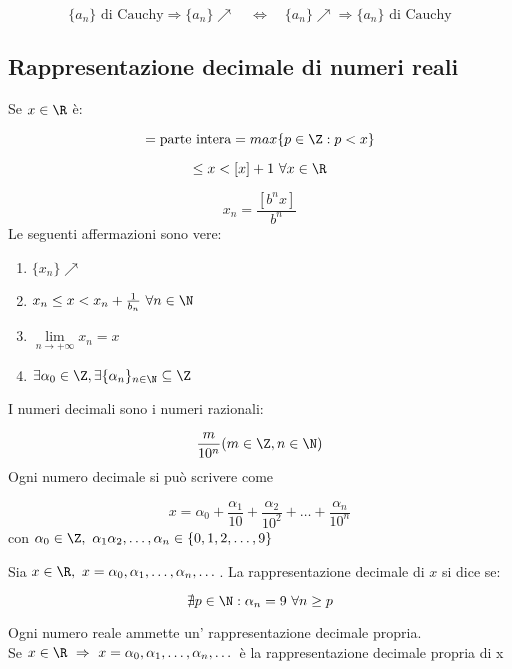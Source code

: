 \documentclass[../appunti.tex]{subfiles}
\begin{document}
\begin{equation}
	\{ a_n \} \mbox{ di Cauchy} \Rightarrow \{ a_n \} \nearrow \quad \iff
 	\quad \{ a_n \}  \nearrow \Rightarrow  \{a_n \}  \mbox{ di Cauchy}
\end{equation}
\subsection{Rappresentazione decimale di numeri reali}
Se $ x \in \R $ è:

\begin{equation}
	[ x ] = \mbox{parte intera} = max\{ p \in \Z: p < x \} 
\end{equation}
\bda

\begin{equation}
	[ x ] \leq x < [ x ] + 1\ \forall x \in \R 
\end{equation}
\bda 

\begin{equation}
	x_n = \frac{[b^nx]}{b^n}
\end{equation}
Le seguenti affermazioni sono vere:

\begin{enumerate}
	\item $\{ x_n \} \nearrow $ 
	\item $x_n \leq x < x_n + \frac{1}{b_n}\ \forall n \in \N $
	\item $\lim \limits_{n \to + \infty} x_n = x $
	\item $\exists \alpha_0 \in \Z, \exists \{ \alpha_n \}_{n \in \N} \subseteq \Z $
\end{enumerate}


\begin{defn}[Decimali]
I numeri decimali sono i numeri razionali:

\begin{equation}
	\frac{m}{10^n} ( m \in \Z, n \in \N )
\end{equation}
Ogni numero decimale si può scrivere come 

\begin{equation}
	x = \alpha_0 + \frac{\alpha_1}{10} + \frac{\alpha_2}{10^2} + \dots + \frac{\alpha_n}{10^n}
\end{equation}
con $ \alpha_0 \in \Z,\ \alpha_1 \alpha_2, \dots, \alpha_n \in \{ 0,1,2,\dots,9 \}$

\end{defn}

\begin{defn}
Sia $ x \in \R,\ x = \alpha_0, \alpha_1, \dots, \alpha_n, \dots$.
La rappresentazione decimale di $x$ si dice  se:

\begin{equation}
	\nexists p \in \N : \alpha_n = 9\ \forall n \geq p
\end{equation}
\end{defn}
Ogni numero reale ammette un' rappresentazione decimale propria.\\
Se $ x \in \R\ \Rightarrow\ x = \alpha_0, \alpha_1, \dots, \alpha_n, \dots$
è la rappresentazione decimale propria di x 
\end{document}
